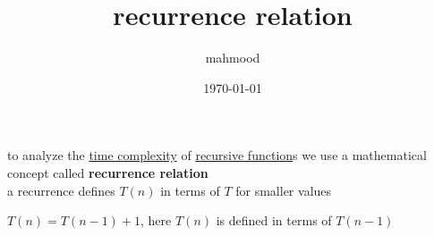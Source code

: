 \documentclass[a4paper,12pt]{article}
\author{mahmood}
\date{\today}
\title{recurrence relation}
\begin{document}
\maketitle
to analyze the \href{20221130014441-time_complexity.org}{time complexity} of \href{20221105001640-recursive_function.org}{recursive function}s we use a mathematical concept called \textbf{recurrence relation}\\[0pt]
a recurrence defines \(T(n)\) in terms of \(T\) for smaller values\\[0pt]
\begin{my_example}
\(T(n) = T(n-1) + 1\), here \(T(n)\) is defined in terms of \(T(n-1)\)\\[0pt]
\end{my_example}
\end{document}
